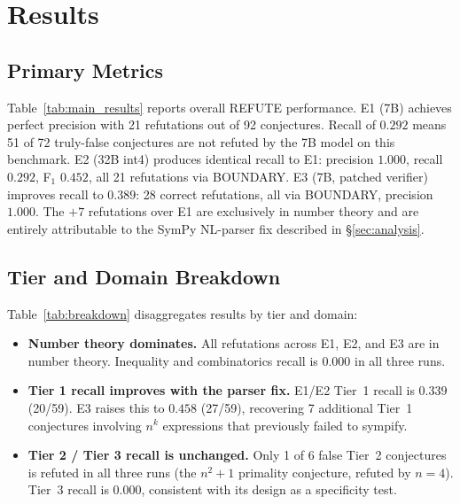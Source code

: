 \section{Results}
\label{sec:results}

\subsection{Primary Metrics}

Table~\ref{tab:main_results} reports overall REFUTE performance.
E1 (7B) achieves perfect precision with 21 refutations out of 92 conjectures.
Recall of $0.292$ means 51 of 72 truly-false conjectures are not refuted
by the 7B model on this benchmark.
E2 (32B int4) produces identical recall to E1: precision $1.000$, recall
$0.292$, F$_1$ $0.452$, all 21 refutations via BOUNDARY.
E3 (7B, patched verifier) improves recall to $0.389$: 28 correct refutations,
all via BOUNDARY, precision $1.000$.
The $+7$ refutations over E1 are exclusively in number theory and are entirely
attributable to the SymPy NL-parser fix described in \S\ref{sec:analysis}.

\begin{table}[t]
\centering
\small
\caption{REFUTE primary metrics. CI = 95\% bootstrap confidence interval.
E3 figures exclude 2 RANDOM\_STRUCTURED false positives caused by a float64
precision bug (now fixed); see \S\ref{sec:analysis}.}
\label{tab:main_results}

\end{table}

\subsection{Tier and Domain Breakdown}

Table~\ref{tab:breakdown} disaggregates results by tier and domain:

\begin{itemize}[noitemsep]
  \item \textbf{Number theory dominates.}
    All refutations across E1, E2, and E3 are in number theory.
    Inequality and combinatorics recall is $0.000$ in all three runs.

  \item \textbf{Tier 1 recall improves with the parser fix.}
    E1/E2 Tier~1 recall is $0.339$ (20/59).
    E3 raises this to $0.458$ (27/59), recovering
    7 additional Tier~1 conjectures involving $n^k$ expressions that
    previously failed to sympify.

  \item \textbf{Tier 2 / Tier 3 recall is unchanged.}
    Only 1 of 6 false Tier~2 conjectures is refuted in all three runs
    (the $n^2+1$ primality conjecture, refuted by $n=4$).
    Tier~3 recall is $0.000$, consistent with its design as a specificity test.
\end{itemize}


